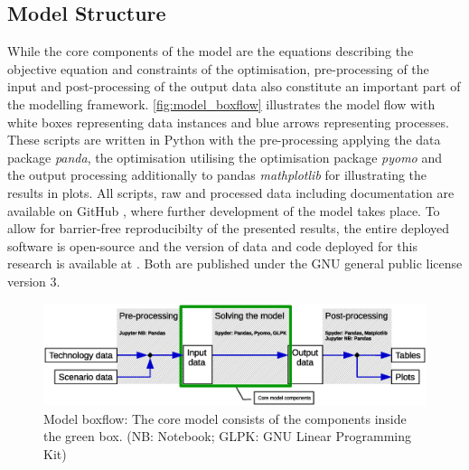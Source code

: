 \documentclass[article]{elsarticle}
\begin{document}
\subsection{Model Structure}
\label{subsec:Structure}
While the core components of the model are the equations describing the objective equation and constraints of the optimisation, pre-processing of the input and post-processing of the output data also constitute an important part of the modelling framework. \autoref{fig:model_boxflow} illustrates the model flow with white boxes representing data instances and blue arrows representing processes. These scripts are written in Python with the pre-processing applying the data package \textit{panda}, the optimisation utilising the optimisation package \textit{pyomo} and the output processing additionally to pandas \textit{mathplotlib} for illustrating the results in plots. All scripts, raw and processed data including documentation are available on GitHub \cite{GitHub2018}, where further development of the model takes place. To allow for barrier-free reproducibilty of the presented results, the entire deployed software is open-source and the version of data and code deployed for this research is available at \cite{Zenodo2018}. Both are published under the GNU general public license version 3.

\begin{figure}[tbh]
    \centering
    \includegraphics[width=\textwidth]{figures/model_boxflow_paper.eps}
    \caption{Model boxflow: The core model consists of the components inside the green box. (NB: Notebook; GLPK: GNU Linear Programming Kit)}
    \label{fig:model_boxflow}
\end{figure}
\end{document}
